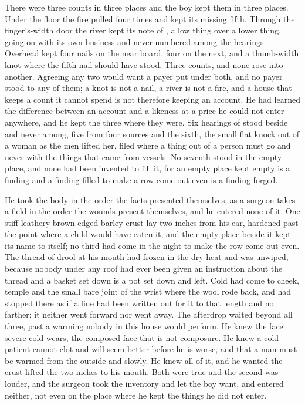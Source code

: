 There were three counts in three places and the boy kept them in three places. Under the floor the fire pulled four times and kept its missing fifth. Through the finger's-width door the river kept its note of , a low thing over a lower thing, going on with its own business and never numbered among the hearings. Overhead  kept four nails on the near board, four on the next, and a thumb-width knot where the fifth nail should have stood. Three counts, and none rose into another. Agreeing any two would want a payer put under both, and no payer stood to any of them; a knot is not a nail, a river is not a fire, and a house that keeps a count it cannot spend is not therefore keeping an account. He had learned the difference between an account and a likeness at a price he could not enter anywhere, and he kept the three where they were. Six hearings of  stood beside and never among, five from four sources and the sixth, the small flat knock out of a woman as the men lifted her, filed where a thing out of a person must go and never with the things that came from vessels. No seventh stood in the empty place, and none had been invented to fill it, for an empty place kept empty is a finding and a finding filled to make a row come out even is a finding forged.

He took the body in the order the facts presented themselves, as a surgeon takes a field in the order the wounds present themselves, and he entered none of it. One stiff leathery brown-edged barley crust lay two inches from his ear, hardened past the point where a child would have eaten it, and the empty place beside it kept its name to itself; no third had come in the night to make the row come out even. The thread of drool at his mouth had frozen in the dry heat and was unwiped, because nobody under any roof had ever been given an instruction about the thread and a basket set down is a pot set down and left. Cold had come to cheek, temple and the small bare joint of the wrist where the wool rode back, and had stopped there as if a line had been written out for it to that length and no farther; it neither went forward nor went away. The afterdrop waited beyond all three, past a warming nobody in this house would perform. He knew the face severe cold wears, the composed face that is not composure. He knew a cold patient cannot clot and will seem better before he is worse, and that a man must be warmed from the outside and slowly. He knew all of it, and he wanted the crust lifted the two inches to his mouth. Both were true and the second was louder, and the surgeon took the inventory and let the boy want, and entered neither, not even on the place where he kept the things he did not enter.

